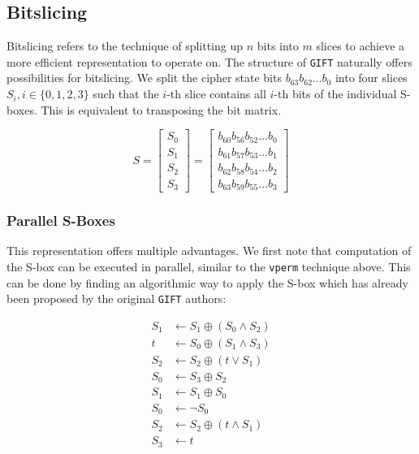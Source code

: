 \subsection{Bitslicing}

Bitslicing refers to the technique of splitting up $n$ bits into $m$ slices to
achieve a more efficient representation to operate on. The structure of
\texttt{GIFT} naturally offers possibilities for bitslicing. We split the
cipher state bits $b_{63}b_{62}\dots b_0$ into four slices $S_i,
i\in\{0,1,2,3\}$ such that the $i$-th slice contains all $i$-th bits of the
individual S-boxes. This is equivalent to transposing the bit matrix.

\[
    S=\begin{bmatrix}
        S_0\\
        S_1\\
        S_2\\
        S_3
    \end{bmatrix}
    =\begin{bmatrix}
        b_{60}b_{56}b_{52}\dots b_0\\
        b_{61}b_{57}b_{53}\dots b_1\\
        b_{62}b_{58}b_{54}\dots b_2\\
        b_{63}b_{59}b_{55}\dots b_3
    \end{bmatrix}
\]

\subsubsection{Parallel S-Boxes}

This representation offers multiple advantages. We first note that computation
of the S-box can be executed in parallel, similar to the \texttt{vperm}
technique above. This can be done by finding an algorithmic way to apply the
S-box which has already been proposed by the original \texttt{GIFT} authors:

\begin{align*}
    S_1&\leftarrow S_1\oplus (S_0\land S_2) \\
    t&\leftarrow S_0\oplus (S_1\land S_3) \\
    S_2&\leftarrow S_2\oplus (t\lor S_1) \\
    S_0&\leftarrow S_3\oplus S_2 \\
    S_1&\leftarrow S_1\oplus S_0 \\
    S_0&\leftarrow \lnot S_0 \\
    S_2&\leftarrow S_2\oplus (t\land S_1) \\
    S_3&\leftarrow t
\end{align*}

